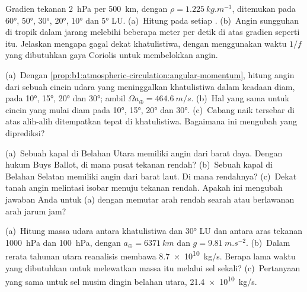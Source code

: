 \begin{exercise}[$\star\star$]\label{exo:b1:atmospheric-circulation:5}
Gradien tekanan \qty{2}{hPa} per \qty{500}{km}, dengan $\rho =
\qty{1.225}{kg.m^{-3}}$, ditemukan pada \ang{60}, \ang{50}, \ang{30}, \ang{20},
\ang{10} dan \ang{5} LU. (a)~Hitung  pada setiap .
(b)~Angin sungguhan di tropik dalam jarang melebihi beberapa meter per detik di atas gradien
seperti itu. Jelaskan mengapa  gagal dekat khatulistiwa, dengan menggunakan
waktu $1/f$ yang dibutuhkan gaya Coriolis untuk membelokkan angin.
\end{exercise}

\begin{exercise}[$\star\star$]\label{exo:b1:atmospheric-circulation:6}
(a)~Dengan \cref{prop:b1:atmospheric-circulation:angular-momentum}, hitung angin dari sebuah
cincin udara yang meninggalkan khatulistiwa dalam keadaan diam, pada \ang{10}, \ang{15}, \ang{20} dan
\ang{30}; ambil $\Omega a_\oplus = \qty{464.6}{m/s}$. (b)~Hal yang sama untuk cincin yang
mulai diam pada \ang{10}, \ang{15}, \ang{20} dan \ang{30}. (c)~Cabang naik  tersebar
di atas  alih-alih ditempatkan tepat di khatulistiwa. Bagaimana ini mengubah  yang diprediksi?
\end{exercise}

\begin{exercise}[$\star\star$]\label{exo:b1:atmospheric-circulation:7}
(a)~Sebuah kapal di Belahan Utara memiliki angin dari barat daya. Dengan hukum Buys Ballot, di mana pusat tekanan rendah? (b)~Sebuah kapal di Belahan Selatan memiliki angin dari barat laut. Di mana rendahnya?
(c)~Dekat tanah angin melintasi isobar menuju tekanan rendah. Apakah ini mengubah jawaban Anda untuk (a) dengan memutar arah rendah searah atau berlawanan arah jarum jam?
\end{exercise}

\begin{exercise}[$\star\star$]\label{exo:b1:atmospheric-circulation:8}
(a)~Hitung massa udara antara khatulistiwa dan \ang{30} LU dan antara aras tekanan
\qty{1000}{hPa} dan \qty{100}{hPa}, dengan $a_\oplus = \qty{6371}{km}$
dan $g = \qty{9.81}{m.s^{-2}}$. (b)~Dalam rerata tahunan  utara reanalisis
membawa \qty{8.7e10}{kg/s}. Berapa lama waktu yang dibutuhkan untuk melewatkan massa itu
melalui sel sekali? (c)~Pertanyaan yang sama untuk sel musim dingin belahan utara,
\qty{21.4e10}{kg/s}.
\end{exercise}

